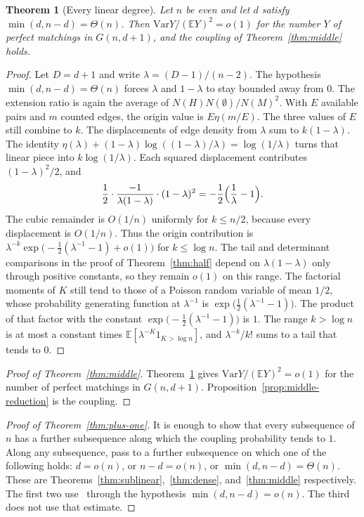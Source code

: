 \documentclass[11pt]{article}
\newtheorem{theorem}{Theorem}
\newcommand{\EE}{\mathbb{E}}
\newcommand{\Var}{\mathrm{Var}}
\begin{document}
\begin{theorem}[Every linear degree]
\label{thm:band}
Let \(n\) be even and let \(d\) satisfy \(\min(d,n-d)=\Theta(n)\). Then
\(\Var Y/(\EE Y)^2=o(1)\) for the number \(Y\) of perfect matchings in \(G(n,d+1)\), and the coupling of Theorem~\ref{thm:middle} holds.
\end{theorem}

\begin{proof}
Let \(D=d+1\) and write \(\lambda=(D-1)/(n-2)\). The hypothesis \(\min(d,n-d)=\Theta(n)\) forces \(\lambda\) and \(1-\lambda\) to stay bounded away from \(0\).
The extension ratio is again the average of \(N(H)N(\emptyset)/N(M)^2\).
With \(E\) available pairs and \(m\) counted edges, the origin value is \(E\eta(m/E)\).
The three values of \(E\) still combine to \(k\). The displacements of edge density from \(\lambda\) sum to \(k(1-\lambda)\).
The identity \(\eta(\lambda)+(1-\lambda)\log((1-\lambda)/\lambda)=\log(1/\lambda)\) turns that linear piece into \(k\log(1/\lambda)\).
Each squared displacement contributes \((1-\lambda)^2/2\), and
\[
\frac12\cdot\frac{-1}{\lambda(1-\lambda)}\cdot(1-\lambda)^2=-\frac12\Bigl(\frac1\lambda-1\Bigr).
\]
The cubic remainder is \(O(1/n)\) uniformly for \(k\le n/2\), because every displacement is \(O(1/n)\).
Thus the origin contribution is \(\lambda^{-k}\exp\bigl(-\tfrac12(\lambda^{-1}-1)+o(1)\bigr)\) for \(k\le\log n\).
The tail and determinant comparisons in the proof of Theorem~\ref{thm:half} depend on \(\lambda(1-\lambda)\) only through positive constants, so they remain \(o(1)\) on this range.
The factorial moments of \(K\) still tend to those of a Poisson random variable of mean \(1/2\), whose probability generating function at \(\lambda^{-1}\) is \(\exp\bigl(\tfrac12(\lambda^{-1}-1)\bigr)\).
The product of that factor with the constant \(\exp\bigl(-\tfrac12(\lambda^{-1}-1)\bigr)\) is \(1\).
The range \(k>\log n\) is at most a constant times \(\EE[\lambda^{-K}1_{K>\log n}]\), and \(\lambda^{-k}/k!\) sums to a tail that tends to \(0\).
\end{proof}

\begin{proof}[Proof of Theorem~\ref{thm:middle}]
Theorem~\ref{thm:band} gives \(\Var Y/(\EE Y)^2=o(1)\) for the number of perfect matchings in \(G(n,d+1)\).
Proposition~\ref{prop:middle-reduction} is the coupling.
\end{proof}

\begin{proof}[Proof of Theorem~\ref{thm:plus-one}]
It is enough to show that every subsequence of \(n\) has a further subsequence along which the coupling probability tends to \(1\).
Along any subsequence, pass to a further subsequence on which one of the following holds:
\(d=o(n)\), or \(n-d=o(n)\), or \(\min(d,n-d)=\Theta(n)\).
These are Theorems~\ref{thm:sublinear},~\ref{thm:dense}, and~\ref{thm:middle} respectively.
The first two use~\cite[Theorem~6]{Gao20} through the hypothesis \(\min(d,n-d)=o(n)\).
The third does not use that estimate.
\end{proof}
\end{document}
